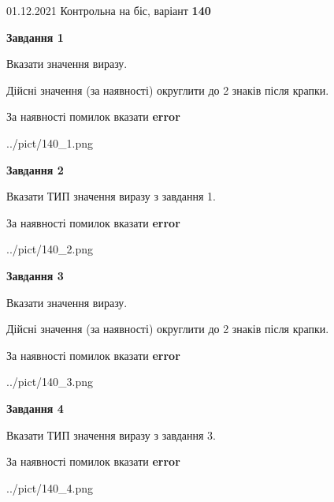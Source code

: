 \documentclass[11pt, ukrainian]{article}
\begin{document}
{01.12.2021 Контрольна на біс, варіант  \No \textbf { 140 }\par}
{
\begin {large}
{\begin {center}\textbf{Завдання 1}\end {center}}\par
Вказати значення виразу. \par
Дійсні значення (за наявності) округлити до 2 знаків після крапки. \par
За наявності помилок вказати \textbf{error}

\begin{center}
	{../pict/140_1.png}
\end{center}
\newpage

{\begin {center}\textbf{Завдання 2}\end {center}}\par
Вказати ТИП значення виразу з завдання 1. \par
За наявності помилок вказати \textbf{error}

\begin{center}
	{../pict/140_2.png}
\end{center}
\newpage

{\begin {center}\textbf{Завдання 3}\end {center}}\par
Вказати значення виразу. \par
Дійсні значення (за наявності) округлити до 2 знаків після крапки. \par
За наявності помилок вказати \textbf{error}

\begin{center}
	{../pict/140_3.png}
\end{center}
\newpage

{\begin {center}\textbf{Завдання 4}\end {center}}\par
Вказати ТИП значення виразу з завдання 3. \par
За наявності помилок вказати \textbf{error}

\begin{center}
	{../pict/140_4.png}
\end{center}
\newpage


\end{large}}
\end{document}
